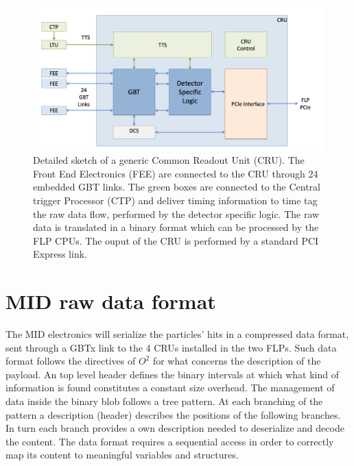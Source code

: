 \begin{figure}[]
\begin{center}
\includegraphics[width=0.9\linewidth]{Chapters/O2/Figs/CRU.png}
\caption{Detailed sketch of a generic Common Readout Unit (CRU). The Front End Electronics (FEE) are connected to the CRU through 24 embedded GBT links. The green boxes are connected to the Central trigger Processor (CTP) and deliver timing information to time tag the raw data flow, performed by the detector specific logic. The raw data is translated in a binary format which can be processed by the FLP CPUs. The ouput of the CRU is performed by a standard PCI Express link.}
\label{fig:O2_TF}
\end{center}
\end{figure}

\section{MID raw data format}
The MID electronics will serialize the particles' hits in a compressed data format, sent through a GBTx link to the 4 CRUs installed in the two FLPs.
Such data format follows the directives of $O^2$ for what concerns the description of the payload.
An top level header defines the binary intervals at which what kind of information is found constitutes a constant size overhead.
The management of data inside the binary blob follows a tree pattern.
At each branching of the pattern a description (header) describes the positions of the following branches.
In turn each branch provides a own description needed to deserialize and decode the content.
The data format requires a sequential access in order to correctly map its content to meaningful variables and structures.

